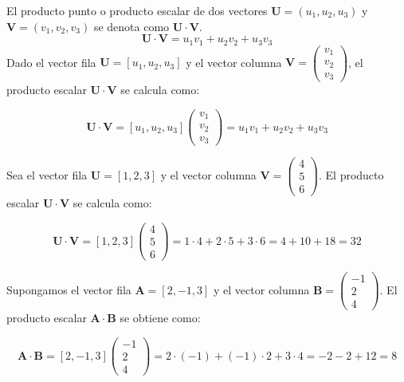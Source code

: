 \begin{definition}
El producto punto o producto escalar de dos vectores $\mathbf{U} = (u_1, u_2, u_3)$ y $\mathbf{V} = (v_1, v_2, v_3)$ se denota como $\mathbf{U} \cdot \mathbf{V}$.
    \[
\boldsymbol{U} \cdot \boldsymbol{V} = u_1 v_1 + u_2 v_2 + u_3 v_3
\]
Dado el vector fila \( \mathbf{U} = [u_1, u_2, u_3] \) y el vector columna \( \mathbf{V} = \begin{pmatrix} v_1 \\ v_2 \\ v_3 \end{pmatrix} \), el producto escalar \( \mathbf{U} \cdot \mathbf{V} \) se calcula como:

\[
\boldsymbol{U} \cdot \boldsymbol{V} = [u_1, u_2, u_3] \begin{pmatrix} v_1 \\ v_2 \\ v_3 \end{pmatrix} = u_1 v_1 + u_2 v_2 + u_3 v_3
\]
\end{definition}
\begin{example}
Sea el vector fila \( \mathbf{U} = [1, 2, 3] \) y el vector columna \( \mathbf{V} = \begin{pmatrix} 4 \\ 5 \\ 6 \end{pmatrix} \). El producto escalar \( \mathbf{U} \cdot \mathbf{V} \) se calcula como:

\[
\boldsymbol{U} \cdot \boldsymbol{V} = [1, 2, 3] \begin{pmatrix} 4 \\ 5 \\ 6 \end{pmatrix} = 1 \cdot 4 + 2 \cdot 5 + 3 \cdot 6 = 4 + 10 + 18 = 32
\]    
\end{example}
\begin{example}
Supongamos el vector fila \( \mathbf{A} = [2, -1, 3] \) y el vector columna \( \mathbf{B} = \begin{pmatrix} -1 \\ 2 \\ 4 \end{pmatrix} \). El producto escalar \( \mathbf{A} \cdot \mathbf{B} \) se obtiene como:

\[
\mathbf{A} \cdot \mathbf{B} = [2, -1, 3] \begin{pmatrix} -1 \\ 2 \\ 4 \end{pmatrix} = 2 \cdot (-1) + (-1) \cdot 2 + 3 \cdot 4 = -2 - 2 + 12 = 8
\]

\end{example}
